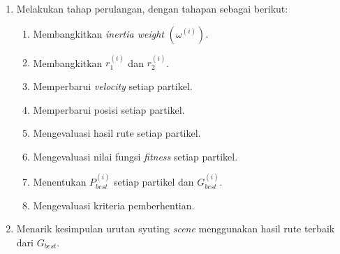 {\begin{enumerate}[align=left, left=0mm, nolistsep]
\begin{enumerate}[label=(\alph*), align=left, left=0mm, nolistsep]
                  \item Menentukan \textit{velocity} maksimum $(V_{max})$.
                  \item Membangkitkan \textit{velocity} awal $(\textbf{\textit{V}}_{j}^{(0)})$ sejumlah $N$ partikel.
                  \item Membangkitkan posisi awal $(\textbf{\textit{X}}_{j}^{(0)})$ sejumlah $N$ partikel.
                  \item Mengevaluasi hasil rute setiap partikel.
                  \item Mengevaluasi nilai fungsi \textit{fitness} setiap partikel.
                  \item Menentukan $P_{best,j}^{(0)}$ setiap partikel dan $G_{best}^{(0)}$.
              \end{enumerate}
        \item Melakukan tahap perulangan, dengan tahapan sebagai berikut: \par \nobreak
              \begin{enumerate}[label=(\alph*), align=left, left=0mm, nolistsep]
                  \item Membangkitkan \textit{inertia weight} $(\omega^{(i)})$.
                  \item Membangkitkan $r_{1}^{(i)}$ dan $r_{2}^{(i)}$.
                  \item Memperbarui \textit{velocity} setiap partikel.
                  \item Memperbarui posisi setiap partikel.
                  \item Mengevaluasi hasil rute setiap partikel.
                  \item Mengevaluasi nilai fungsi \textit{fitness} setiap partikel.
                  \item Menentukan $P_{best}^{(i)}$ setiap partikel dan $G_{best}^{(i)}$.
                  \item Mengevaluasi kriteria pemberhentian.
              \end{enumerate}
        \item Menarik kesimpulan urutan syuting \textit{scene} menggunakan hasil rute terbaik dari $G_{best}$.
    \end{enumerate}

}
\vspace{-3mm}

\pagebreak
